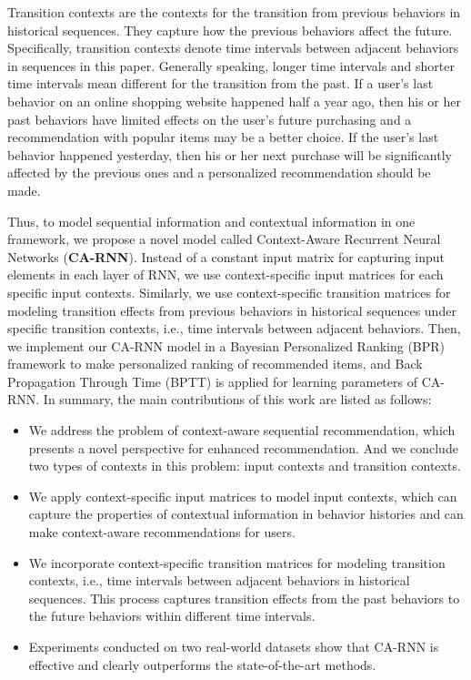 \documentclass[conference]{IEEEtran}
\begin{document}
Transition contexts are the contexts for the transition from previous behaviors in historical sequences. They capture how the previous behaviors affect the future. Specifically, transition contexts denote time intervals between adjacent behaviors in sequences in this paper. Generally speaking, longer time intervals and shorter time intervals mean different for the transition from the past. If a user's last behavior on an online shopping website happened half a year ago, then his or her past behaviors have limited effects on the user's future purchasing and a recommendation with popular items may be a better choice. If the user's last behavior happened yesterday, then his or her next purchase will be significantly affected by the previous ones and a personalized recommendation should be made.

Thus, to model sequential information and contextual information in one framework, we propose a novel model called Context-Aware Recurrent Neural Networks (\textbf{CA-RNN}). Instead of a constant input matrix for capturing input elements in each layer of RNN, we use context-specific input matrices for each specific input contexts. Similarly, we use context-specific transition matrices for modeling transition effects from previous behaviors in historical sequences under specific transition contexts, i.e., time intervals between adjacent behaviors. Then, we implement our CA-RNN model in a Bayesian Personalized Ranking (BPR) \cite{rendle2009bpr} framework to make personalized ranking of recommended items, and Back Propagation Through Time (BPTT) \cite{rumelhart1988learning} is applied for learning parameters of CA-RNN. In summary, the main contributions of this work are listed as follows:

\begin{itemize}
\item
We address the problem of context-aware sequential recommendation, which presents a novel perspective for enhanced recommendation. And we conclude two types of contexts in this problem: input contexts and transition contexts.

\item
We apply context-specific input matrices to model input contexts, which can capture the properties of contextual information in behavior histories and can make context-aware recommendations for users.

\item
We incorporate context-specific transition matrices for modeling transition contexts, i.e., time intervals between adjacent behaviors in historical sequences. This process captures transition effects from the past behaviors to the future behaviors within different time intervals.

\item
Experiments conducted on two real-world datasets show that CA-RNN is effective and clearly outperforms the state-of-the-art methods.

\end{itemize}
\end{document}
